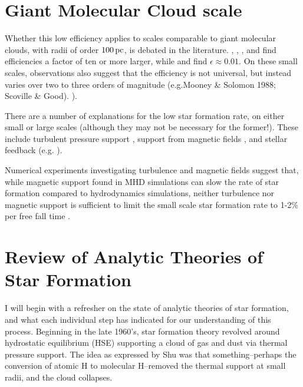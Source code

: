 \documentclass[../dissertation.tex]{subfiles}
\begin{document}
\section{Giant Molecular Cloud scale}
Whether this low efficiency applies to scales comparable to giant molecular clouds, with radii of
order $100\,\rm pc$, is debated in the literature.
\citet{2010ApJ...723.1019H}, \citet{2010ApJ...724..687L}, \citet{2010ApJS..188..313W}, and \citet{2011ApJ...729..133M} 
find efficiencies a factor of ten or more larger, while \citet{2007ApJ...654..304K} and \citet{2012ApJ...745...69K} 
find $\epsilon\approx0.01$.
On these small scales, observations also suggest that the efficiency is not universal, but instead 
varies over two to three orders of magnitude (e.g.Mooney \& Solomon 1988; Scoville \& Good).  
\citealt{1988ApJ...334L..51M,2016ApJ...833..229L}).%

There are a number of explanations for the low star formation rate, on 
either small or large scales (although they may not be necessary for the former!). 
These include turbulent pressure support \citep{1992ApJ...396..631M}, support from magnetic fields
\citep{1966MNRAS.132..359S,1976ApJ...207..141M}, and stellar feedback (e.g.
\citealt{1986ApJ...303...39D}).  


Numerical experiments investigating turbulence and magnetic fields suggest that, while magnetic support found in MHD simulations can slow the rate of star formation 
compared to hydrodynamics simulations, neither turbulence nor magnetic support is sufficient to limit the small scale star formation rate to 1-2\% per free fall time
\citep{2010ApJ...709...27W,2011MNRAS.410L...8C,2011ApJ...730...40P,2012ApJ...754...71K,2014MNRAS.439.3420M,2015ApJ...808...48B,2017ApJ...838...40M}.

\section{Review of Analytic Theories of Star Formation} \label{sec:sf_review}
I will begin with a refresher on the state of analytic theories of star formation, and what each individual step has indicated for our understanding of this process.
Beginning in the late 1960's, star formation theory revolved around hydrostatic equilibrium (HSE) supporting a cloud of gas and dust via thermal pressure support. 
The idea as expressed by Shu was that something--perhaps the conversion of atomic H to molecular H--removed the thermal support at small radii, and the cloud collapses.
\end{document}
